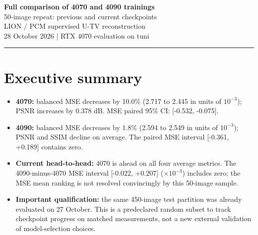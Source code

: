\documentclass[11pt,a4paper]{article}
\begin{document}
\begin{center}
{\LARGE\bfseries Full comparison of 4070 and 4090 trainings}\\[7pt]
{\Large 50-image repeat: previous and current checkpoints}\\[7pt]
LION / PCM supervised U-TV reconstruction\\[4pt]
28 October 2026 | RTX 4070 evaluation on tuni
\end{center}
\hrule\vspace{6pt}
\begin{abstract}
A fully paired comparison on 50 test images (10 sampled without replacement per category), under two predeclared PCM noise regimes. The previous frozen checkpoints (4070 epoch 7, 4090 epoch 22) and current validation-selected checkpoints (4070 epoch 17, 4090 epoch 23) are compared on the exact same 100 acquisitions. The original measurement hashes are reproduced exactly. Two hundred current-checkpoint reconstructions were run on the RTX 4070; the previous checkpoint metrics were reused from the complete 27 October test. Reported confidence intervals use 20,000 paired, category-stratified bootstrap resamples. The images were held out from training and validation but were already used in the earlier full test, so this repeat must not be represented as a new untouched test-set confirmation.
\end{abstract}
\tableofcontents\clearpage
\section{Executive summary}

\begin{itemize}[leftmargin=*]
\item \textbf{4070:} balanced MSE decreases by 10.0\% (2.717 to 2.445 in units of $10^{-3}$); PSNR increases by 0.378 dB. MSE paired 95\% CI: [-0.532, -0.075].
\item \textbf{4090:} balanced MSE decreases by 1.8\% (2.594 to 2.549 in units of $10^{-3}$); PSNR and SSIM decline on average. The paired MSE interval [-0.361, +0.189] contains zero.
\item \textbf{Current head-to-head:} 4070 is ahead on all four average metrics. The 4090-minus-4070 MSE interval [-0.022, +0.207] ($\times 10^{-3}$) includes zero; the MSE mean ranking is not resolved convincingly by this 50-image sample.
\item \textbf{Important qualification:} the same 450-image test partition was already evaluated on 27 October. This is a predeclared random subset to track checkpoint progress on matched measurements, not a new external validation of model-selection choices.
\end{itemize}
\end{document}
